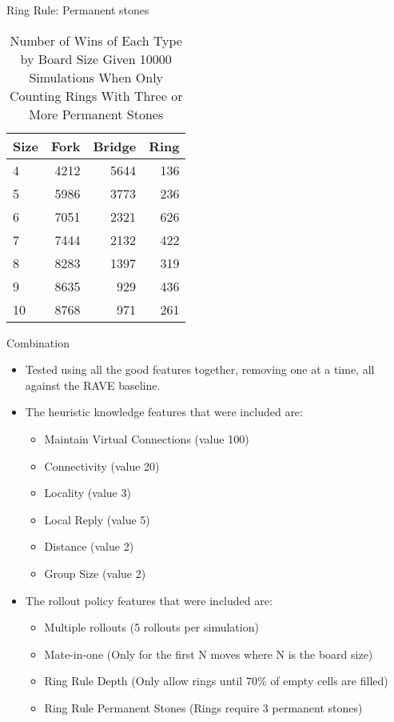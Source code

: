 \documentclass{beamer} %
\begin{document}
\begin{frame}{Ring Rule: Permanent stones}
\begin{table}
	\centering
	\begin{tabular}{l|rrr}
		Size & Fork & Bridge & Ring \\ \hline
		   4 & 4212 &   5644 & 136 \\
		   5 & 5986 &   3773 & 236 \\
		   6 & 7051 &   2321 & 626 \\
		   7 & 7444 &   2132 & 422 \\
		   8 & 8283 &   1397 & 319 \\
		   9 & 8635 &    929 & 436 \\
		  10 & 8768 &    971 & 261 \\
	\end{tabular}
	\caption{Number of Wins of Each Type by Board Size Given 10000 Simulations When Only Counting Rings With Three or More Permanent Stones}
	\label{tab:wintypesperm}
\end{table}
\end{frame}



\begin{frame}{Combination}
\begin{itemize}
\item Tested using all the good features together, removing one at a time, all against the RAVE baseline.

\item The heuristic knowledge features that were included are:
\begin{itemize}
\item Maintain Virtual Connections (value 100)
\item Connectivity (value 20)
\item Locality (value 3)
\item Local Reply (value 5)
\item Distance (value 2)
\item Group Size (value 2)
\end{itemize}

\item The rollout policy features that were included are:
\begin{itemize}
\item Multiple rollouts (5 rollouts per simulation)
\item Mate-in-one (Only for the first N moves where N is the board size)
\item Ring Rule Depth (Only allow rings until 70\% of empty cells are filled)
\item Ring Rule Permanent Stones (Rings require 3 permanent stones)
\end{itemize}
\end{itemize}
\end{frame}
\end{document}
